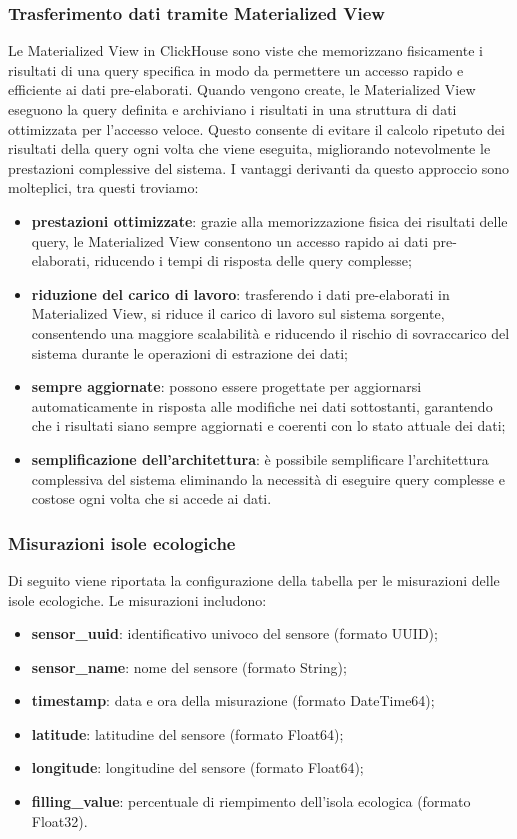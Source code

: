 \subsubsection{Trasferimento dati tramite Materialized View}
Le Materialized View in ClickHouse sono viste che memorizzano fisicamente i risultati di una query specifica in modo da permettere un accesso rapido e efficiente ai dati pre-elaborati. Quando vengono create, le Materialized View eseguono la query definita e archiviano i risultati in una struttura di dati ottimizzata per l'accesso veloce. Questo consente di evitare il calcolo ripetuto dei risultati della query ogni volta che viene eseguita, migliorando notevolmente le prestazioni complessive del sistema. I vantaggi derivanti da questo approccio sono molteplici, tra questi troviamo:
\begin{itemize}
    \item \textbf{prestazioni ottimizzate}: grazie alla memorizzazione fisica dei risultati delle query, le Materialized View consentono un accesso rapido ai dati pre-elaborati, riducendo i tempi di risposta delle query complesse;
    \item \textbf{riduzione del carico di lavoro}: trasferendo i dati pre-elaborati in Materialized View, si riduce il carico di lavoro sul sistema sorgente, consentendo una maggiore scalabilità e riducendo il rischio di sovraccarico del sistema durante le operazioni di estrazione dei dati;
    \item \textbf{sempre aggiornate}: possono essere progettate per aggiornarsi automaticamente in risposta alle modifiche nei dati sottostanti, garantendo che i risultati siano sempre aggiornati e coerenti con lo stato attuale dei dati;
    \item \textbf{semplificazione dell'architettura}: è possibile semplificare l'architettura complessiva del sistema eliminando la necessità di eseguire query complesse e costose ogni volta che si accede ai dati.
\end{itemize}
\subsubsection{Misurazioni isole ecologiche}
Di seguito viene riportata la configurazione della tabella per le misurazioni delle isole ecologiche. Le misurazioni includono:
\begin{itemize}
    \item \textbf{sensor\_uuid}: identificativo univoco del sensore (formato UUID);
    \item \textbf{sensor\_name}: nome del sensore (formato String);
    \item \textbf{timestamp}: data e ora della misurazione (formato DateTime64);
    \item \textbf{latitude}: latitudine del sensore (formato Float64);
    \item \textbf{longitude}: longitudine del sensore (formato Float64);
    \item \textbf{filling\_value}: percentuale di riempimento dell'isola ecologica (formato Float32).
\end{itemize}
